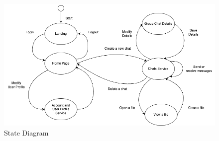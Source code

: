 \documentclass[]{article}
\begin{document}
\begin{figure}[H]
	\centering
	\includegraphics[scale=0.6]{state-diagram.png}
	\caption{State Diagram}
\end{figure}
\end{document}
